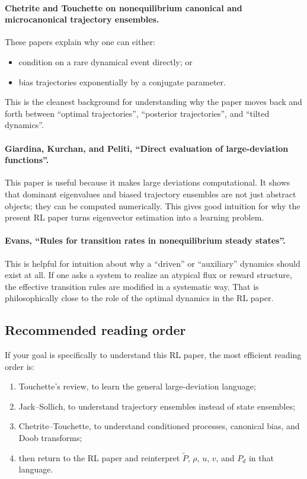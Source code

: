 \documentclass[11pt]{article}
\begin{document}
\paragraph{Chetrite and Touchette on nonequilibrium canonical and microcanonical trajectory ensembles.}
These papers explain why one can either:
\begin{itemize}
    \item condition on a rare dynamical event directly; or
    \item bias trajectories exponentially by a conjugate parameter.
\end{itemize}
This is the cleanest background for understanding why the paper moves back and forth between
``optimal trajectories'', ``posterior trajectories'', and ``tilted dynamics''.

\paragraph{Giardina, Kurchan, and Peliti, ``Direct evaluation of large-deviation functions''.}
This paper is useful because it makes large deviations computational. It shows that dominant
eigenvalues and biased trajectory ensembles are not just abstract objects; they can be
computed numerically. This gives good intuition for why the present RL paper turns
eigenvector estimation into a learning problem.

\paragraph{Evans, ``Rules for transition rates in nonequilibrium steady states''.}
This is helpful for intuition about why a ``driven'' or ``auxiliary'' dynamics should exist at
all. If one asks a system to realize an atypical flux or reward structure, the effective
transition rules are modified in a systematic way. That is philosophically close to the role
of the optimal dynamics in the RL paper.

\subsection*{Recommended reading order}

If your goal is specifically to understand this RL paper, the most efficient reading order is:
\begin{enumerate}
    \item Touchette's review, to learn the general large-deviation language;
    \item Jack--Sollich, to understand trajectory ensembles instead of state ensembles;
    \item Chetrite--Touchette, to understand conditioned processes, canonical bias, and Doob
    transforms;
    \item then return to the RL paper and reinterpret \(\widetilde{P}\), \(\rho\), \(u\), \(v\),
    and \(P_d\) in that language.
\end{enumerate}
\end{document}
